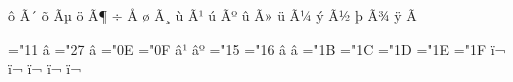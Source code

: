 \mubyte ^^f4 ^^c3^^b4\endmubyte %
\mubyte ^^f5 ^^c3^^b5\endmubyte %
\mubyte ^^f6 ^^c3^^b6\endmubyte %
\mubyte ^^f7 ^^c5^^93\endmubyte %
\mubyte ^^f8 ^^c3^^b8\endmubyte %
\mubyte ^^f9 ^^c3^^b9\endmubyte %
\mubyte ^^fa ^^c3^^ba\endmubyte %
\mubyte ^^fb ^^c3^^bb\endmubyte %
\mubyte ^^fc ^^c3^^bc\endmubyte %
\mubyte ^^fd ^^c3^^bd\endmubyte %
\mubyte ^^fe ^^c3^^be\endmubyte %
\mubyte ^^ff ^^c3^^9f\endmubyte %

\chardef\erqq="11
\mubyte \erqq ^^e2^^80^^9d\endmubyte %
\chardef\erq="27
\mubyte \erq ^^e2^^80^^99\endmubyte %
\chardef\flq="0E
\chardef\frq="0F
\mubyte \flq ^^e2^^80^^b9\endmubyte %
\mubyte \frq ^^e2^^80^^ba\endmubyte %
\chardef\endash="15
\chardef\emdash="16
\mubyte \endash ^^e2^^80^^93\endmubyte %
\mubyte \emdash ^^e2^^80^^94\endmubyte %
\chardef\utfligatureff="1B
\chardef\utfligaturefi="1C
\chardef\utfligaturefl="1D
\chardef\utfligatureffi="1E
\chardef\utfligatureffl="1F
\mubyte \utfligatureff ^^ef^^ac^^80\endmubyte %
\mubyte \utfligaturefi ^^ef^^ac^^81\endmubyte %
\mubyte \utfligaturefl ^^ef^^ac^^82\endmubyte %
\mubyte \utfligatureffi ^^ef^^ac^^83\endmubyte %
\mubyte \utfligatureffl ^^ef^^ac^^84\endmubyte %



 

\let\csaccents=\relax \let\cmaccents=\relax

 


